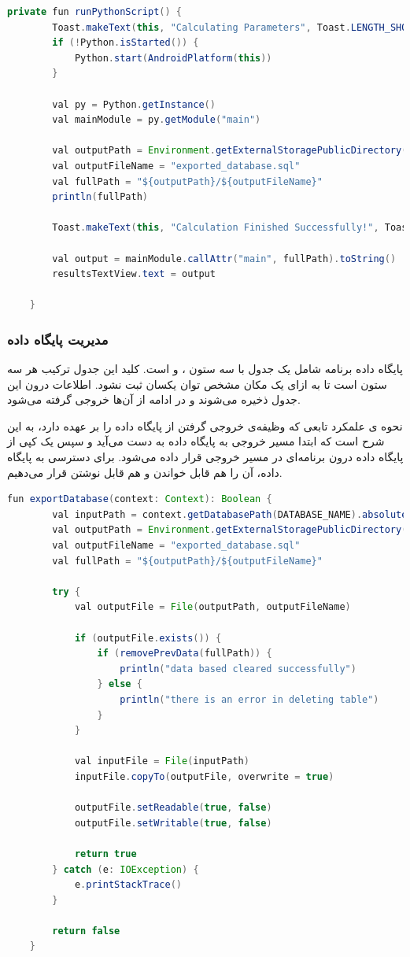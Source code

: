 \begin{lstlisting}[language=Java]
	private fun runPythonScript() {
		Toast.makeText(this, "Calculating Parameters", Toast.LENGTH_SHORT).show()
		if (!Python.isStarted()) {
			Python.start(AndroidPlatform(this))
		}
		
		val py = Python.getInstance()
		val mainModule = py.getModule("main")
		
		val outputPath = Environment.getExternalStoragePublicDirectory(Environment.DIRECTORY_DOWNLOADS)
		val outputFileName = "exported_database.sql"
		val fullPath = "${outputPath}/${outputFileName}"
		println(fullPath)
		
		Toast.makeText(this, "Calculation Finished Successfully!", Toast.LENGTH_SHORT).show()
		
		val output = mainModule.callAttr("main", fullPath).toString()
		resultsTextView.text = output
		
	}
\end{lstlisting}

\subsubsection{مدیریت پایگاه داده}
پایگاه داده برنامه شامل یک جدول با سه ستون ،  و  است. کلید این جدول ترکیب هر سه ستون است تا به ازای یک مکان مشخص توان یکسان ثبت نشود. اطلاعات درون این جدول ذخیره می‌شوند و در ادامه از آن‌ها خروجی گرفته می‌شود.

نحوه ی علمکرد تابعی که وظیفه‌ی خروجی گرفتن از پایگاه داده را بر عهده دارد، به این شرح است که ابتدا مسیر خروجی به پایگاه داده به دست می‌آید و سپس یک کپی از پایگاه داده درون برنامه‌ای در مسیر خروجی قرار داده می‌شود. برای دسترسی به پایگاه داده، آن را هم قابل خواندن و هم قابل نوشتن قرار می‌دهیم.

\begin{lstlisting}[language=Java]
	fun exportDatabase(context: Context): Boolean {
		val inputPath = context.getDatabasePath(DATABASE_NAME).absolutePath
		val outputPath = Environment.getExternalStoragePublicDirectory(Environment.DIRECTORY_DOWNLOADS)
		val outputFileName = "exported_database.sql"
		val fullPath = "${outputPath}/${outputFileName}"
		
		try {
			val outputFile = File(outputPath, outputFileName)
			
			if (outputFile.exists()) {
				if (removePrevData(fullPath)) {
					println("data based cleared successfully")
				} else {
					println("there is an error in deleting table")
				}
			}
			
			val inputFile = File(inputPath)
			inputFile.copyTo(outputFile, overwrite = true)
			
			outputFile.setReadable(true, false)
			outputFile.setWritable(true, false)
			
			return true
		} catch (e: IOException) {
			e.printStackTrace()
		}
		
		return false
	}
\end{lstlisting}

